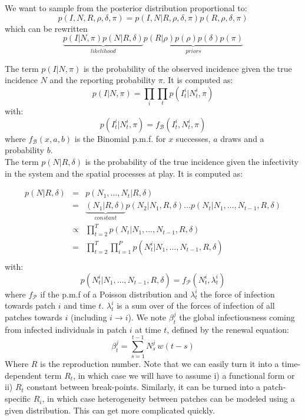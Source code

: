 \documentclass[a4paper,11pt]{article}
\begin{document}
We want to sample from the posterior distribution proportional to:
\begin{equation}
 p(I, N, R, \rho, \delta, \pi) = p(I, N | R, \rho, \delta, \pi)  
 p(R, \rho, \delta, \pi)
\end{equation}
which can be rewritten
\begin{equation}
\underbrace{p(I | N, \pi) p(N | R, \delta) }_{likelihood} 
\underbrace{ p(R | \rho) p(\rho) p(\delta) p(\pi)}_{priors} 
\end{equation}

The term $p(I | N, \pi)$ is the probability of the observed incidence given the 
true incidence $N$ and the reporting probability $\pi$.
It is computed as:
\begin{equation}
p(I | N, \pi) = \prod_{i}\prod_{t} p(I_t^i| N_t^i, \pi)
\end{equation}
with:
\begin{equation}
p(I_t^i| N_t^i, \pi) = f_\mathcal{B}(I_t^i, N_t^i, \pi)
\end{equation}
where $f_\mathcal{B}(x,a,b)$ is the Binomial p.m.f. for $x$ successes, $a$ draws 
and a probability $b$.
\\

The term $p(N | R, \delta)$ is the probability of the true incidence 
given the infectivity in the system and the spatial processes at play.
It is computed as:

\begin{eqnarray}
p(N | R, \delta) & = & p(N_1, \ldots, N_t | R, \delta)\\
 & = & \underbrace{(N_1| R, \delta)}_{constant} p(N_2| N_1, R, \delta) \ldots 
       p(N_t| N_1, \ldots, N_{t-1}, R, \delta) \\
 & \propto & \prod_{t=2}^T p(N_t| N_1, \ldots, N_{t-1}, R, \delta)\\
 & = & \prod_{t=2}^T \prod_{i=1}^P 
       p(N_t^i| N_1, \ldots, N_{t-1}, R, \delta)\\
\end{eqnarray}
with:
\begin{equation}
p(N_t^i| N_1, \ldots, N_{t-1}, R, \delta) = f_\mathcal{P}(N_t^i, \lambda_t^i)
\end{equation}
where $f_\mathcal{P}$ if the p.m.f of a Poisson distribution and $\lambda_t^i$ 
the force of infection towards patch $i$ and time $t$.
$\lambda_t^i$ is a sum over of the forces of infection of all patches towards $i$ (including $i \rightarrow i$). 
We note $\beta_t^j$ the global infectiousness coming from infected individuals 
in patch $i$ at time $t$, defined by the renewal equation:
\begin{equation}
 \beta_t^j = \sum_{s=1}^{t-1} N_s^j \:  w(t - s)
\end{equation}
Where $R$ is the reproduction number. 
Note that we can easily turn it into a time-dependent term $R_t$, in which case 
we will have to assume i) a functional form or ii) $R_t$ constant 
between break-points. 
Similarly, it can be turned into a patch-specific $R_i$, in which case 
heterogeneity between patches can be modeled using a given distribution.
This can get more complicated quickly.
\\
\end{document}
